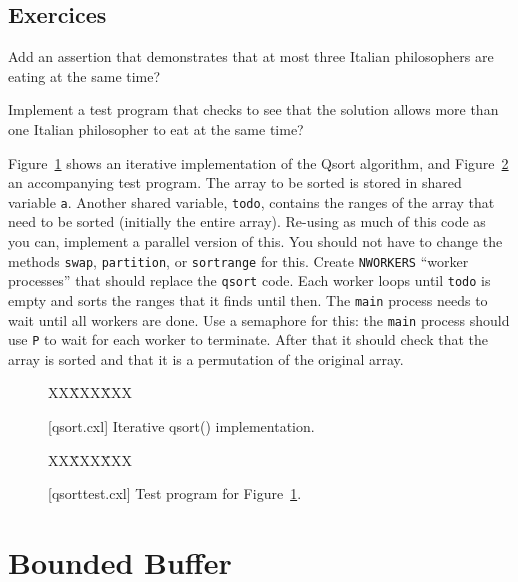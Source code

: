 \documentclass{report}
\newcommand{\cxlsource}[1]{
\begin{tabbing}
XX\=XXX\=XXX\kill
    
\end{tabbing}
}
\newenvironment{code}{
\tcolorbox
}{
\endtcolorbox
}
\begin{document}
\section*{Exercices}
\begin{problems}
\item Add an assertion that demonstrates that at most three
Italian philosophers are eating at the same time?
\item Implement a test program that checks to see that
the solution allows more than one Italian philosopher to eat at the same time?
\item \label{ex:qsort}
Figure~\ref{fig:qsort} shows an iterative implementation of the Qsort
algorithm, and Figure~\ref{fig:qsorttest} an accompanying test program.
The array to be sorted is stored in  shared variable \texttt{a}.
Another shared variable, \texttt{todo}, contains the ranges of the
array that need to be sorted (initially the entire array).
Re-using as much of this code as you can, implement a parallel version of
this.  You should not have to change the methods \texttt{swap}, \texttt{partition},
or \texttt{sortrange} for this.  Create \texttt{NWORKERS} ``worker processes''
that should replace the \texttt{qsort} code.  Each worker loops until \texttt{todo}
is empty and sorts the ranges that it finds until then.  The \texttt{main}
process needs to wait until all workers are done.  Use a semaphore for this:
the \texttt{main} process should use \texttt{P} to wait for each
worker to terminate.  After that it should check that the array is sorted and
that it is a permutation of the original array.
\end{problems}

\begin{figure}
\begin{code}
\cxlsource{qsort}
\end{code}
\caption{[qsort.cxl] Iterative qsort() implementation.}
\label{fig:qsort}
\end{figure}

\begin{figure}
\begin{code}
\cxlsource{qsorttest}
\end{code}
\caption{[qsorttest.cxl] Test program for Figure~\ref{fig:qsort}.}
\label{fig:qsorttest}
\end{figure}

\chapter{Bounded Buffer}
\label{ch:bb}
\end{document}
